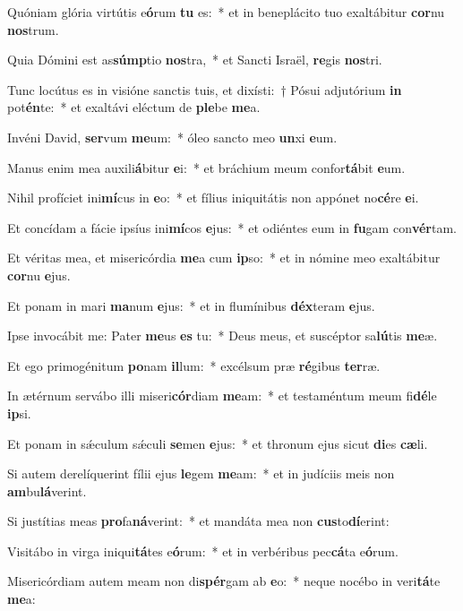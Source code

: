 \item Quóniam glória virtútis e\textbf{ó}rum \textbf{tu} es:~* et in beneplácito tuo exaltábitur \textbf{cor}nu \textbf{nos}trum.
\item Quia Dómini est as\textbf{súmp}tio \textbf{nos}tra,~* et Sancti Israël, \textbf{re}gis \textbf{nos}tri.
\item Tunc locútus es in visióne sanctis tuis, et dixísti:~† Pósui adjutórium \textbf{in} pot\textbf{én}te:~* et exaltávi eléctum de \textbf{ple}be \textbf{me}a.
\item Invéni David, \textbf{ser}vum \textbf{me}um:~* óleo sancto meo \textbf{un}xi \textbf{e}um.
\item Manus enim mea auxili\textbf{á}bitur \textbf{e}i:~* et bráchium meum confor\textbf{tá}bit \textbf{e}um.
\item Nihil profíciet ini\textbf{mí}cus in \textbf{e}o:~* et fílius iniquitátis non appónet no\textbf{cé}re \textbf{e}i.
\item Et concídam a fácie ipsíus ini\textbf{mí}cos \textbf{e}jus:~* et odiéntes eum in \textbf{fu}gam con\textbf{vér}tam.
\item Et véritas mea, et misericórdia \textbf{me}a cum \textbf{ip}so:~* et in nómine meo exaltábitur \textbf{cor}nu \textbf{e}jus.
\item Et ponam in mari \textbf{ma}num \textbf{e}jus:~* et in flumínibus \textbf{déx}teram \textbf{e}jus.
\item Ipse invocábit me: Pater \textbf{me}us \textbf{es} tu:~* Deus meus, et suscéptor sa\textbf{lú}tis \textbf{me}æ.
\item Et ego primogénitum \textbf{po}nam \textbf{il}lum:~* excélsum præ \textbf{ré}gibus \textbf{ter}ræ.
\item In ætérnum servábo illi miseri\textbf{cór}diam \textbf{me}am:~* et testaméntum meum fi\textbf{dé}le \textbf{ip}si.
\item Et ponam in sǽculum sǽculi \textbf{se}men \textbf{e}jus:~* et thronum ejus sicut \textbf{di}es \textbf{cæ}li.
\item Si autem derelíquerint fílii ejus \textbf{le}gem \textbf{me}am:~* et in judíciis meis non \textbf{am}bu\textbf{lá}verint.
\item Si justítias meas \textbf{pro}fa\textbf{ná}ve\-rint:~* et mandáta mea non \textbf{cus}to\textbf{dí}erint:
\item Visitábo in virga iniqui\textbf{tá}tes e\textbf{ó}rum:~* et in verbéribus pec\textbf{cá}ta e\textbf{ó}rum.
\item Misericórdiam autem meam non di\textbf{spér}gam ab \textbf{e}o:~* neque nocébo in veri\textbf{tá}te \textbf{me}a:
